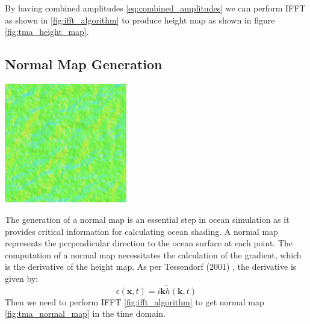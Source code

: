 By having combined amplitudes \ref{eq:combined_amplitudes} we can perform IFFT as shown in \ref{fig:ifft_algorithm} to produce height map as shown in figure \ref{fig:tma_height_map}.

\subsection{Normal Map Generation}
\begin{minipage}{1\textwidth}
    \centering
    \includegraphics[width=0.40\textwidth]{"images/tma_normal.png"}
    \label{fig:tma_normal_map}
\end{minipage}

The generation of a normal map is an essential step in ocean simulation as it provides critical information for calculating ocean shading. A normal map represents the perpendicular direction to the ocean surface at each point.
The computation of a normal map necessitates the calculation of the gradient, which is the derivative of the height map. As per Tessendorf (2001) \cite{tessendorf2001}, the derivative is given by:
\begin{equation}
    \epsilon(\textbf{x}, t) = i\textbf{k} \tilde{h}(\textbf{k}, t)
\end{equation}
Then we need to perform IFFT \ref{fig:ifft_algorithm} to get normal map \ref{fig:tma_normal_map} in the time domain.

